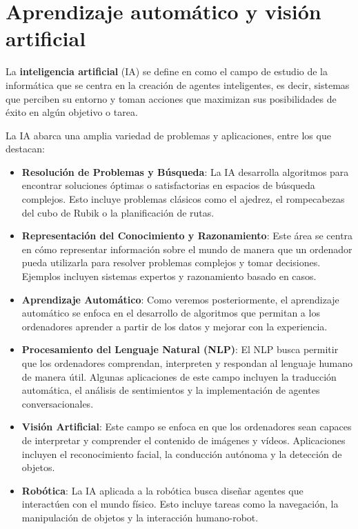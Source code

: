 
\chapter{Aprendizaje automático y visión artificial}

La \textbf{inteligencia artificial} (IA) se define en  \cite{russell2016artificial} como el campo de estudio de la informática que se centra en la creación de agentes inteligentes, es decir, sistemas que perciben su entorno y toman acciones que maximizan sus posibilidades de éxito en algún objetivo o tarea.

La IA abarca una amplia variedad de problemas y aplicaciones, entre los que destacan:

\begin{itemize}
	\item \textbf{Resolución de Problemas y Búsqueda}: La IA desarrolla algoritmos para encontrar soluciones óptimas o satisfactorias en espacios de búsqueda complejos. Esto incluye problemas clásicos como el ajedrez, el rompecabezas del cubo de Rubik o la planificación de rutas.
	
	\item \textbf{Representación del Conocimiento y Razonamiento}: Este área se centra en cómo representar información sobre el mundo de manera que un ordenador pueda utilizarla para resolver problemas complejos y tomar decisiones. Ejemplos incluyen sistemas expertos y razonamiento basado en casos.
	
	\item \textbf{Aprendizaje Automático}: Como veremos posteriormente, el aprendizaje automático se enfoca en el desarrollo de algoritmos que permitan a los ordenadores aprender a partir de los datos y mejorar con la experiencia.
	
	\item \textbf{Procesamiento del Lenguaje Natural (NLP)}: El NLP busca permitir que los ordenadores comprendan, interpreten y respondan al lenguaje humano de manera útil. Algunas aplicaciones de este campo incluyen la traducción automática, el análisis de sentimientos y la implementación de agentes conversacionales.
	
	\item \textbf{Visión Artificial}: Este campo se enfoca en que los ordenadores sean capaces de interpretar y comprender el contenido de imágenes y vídeos. Aplicaciones incluyen el reconocimiento facial, la conducción autónoma y la detección de objetos.
	
	\item \textbf{Robótica}: La IA aplicada a la robótica busca diseñar agentes que interactúen con el mundo físico. Esto incluye tareas como la navegación, la manipulación de objetos y la interacción humano-robot.
\end{itemize}


